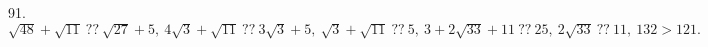 91. $\sqrt{48}+\sqrt{11}\ ??\ \sqrt{27}+5,\ 4\sqrt{3}+\sqrt{11}\ ??\ 3\sqrt{3}+5,\ \sqrt{3}+\sqrt{11}\ ??\ 5,\ 3+2\sqrt{33}+11\ ??\ 25,\
2\sqrt{33}\ ??\ 11,\ 132>121.$\\
